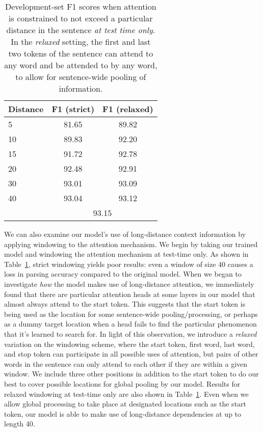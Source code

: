 \documentclass[11pt,a4paper]{article}
\begin{document}
\begin{table}[t!]
\begin{center}
\begin{tabular}{@{}lcc@{}}
\toprule
Distance & \phantom{a}F1 (strict)\phantom{a} & F1 (relaxed) \\
\midrule
5  & 81.65 & 89.82 \\
10 & 89.83 & 92.20 \\
15 & 91.72 & 92.78 \\
20 & 92.48 & 92.91 \\
30 & 93.01 & 93.09 \\
40 & 93.04 & 93.12 \\
 & \multicolumn{2}{c}{93.15} \\
\bottomrule
\end{tabular}
\end{center}
\caption{
\label{table:distance-pretrained}
Development-set F1 scores when attention is constrained to not exceed a particular distance in the sentence \emph{at test time only}. In the \emph{relaxed} setting, the first and last two tokens of the sentence can attend to any word and be attended to by any word, to allow for sentence-wide pooling of information.
}
\end{table}

We can also examine our model's use of long-distance context information by applying windowing to the attention mechanism. We begin by taking our trained model and windowing the attention mechanism at test-time only. As shown in Table~\ref{table:distance-pretrained}, strict windowing yields poor results: even a window of size 40 causes a loss in parsing accuracy compared to the original model. When we began to investigate \emph{how} the model makes use of long-distance attention, we immediately found that there are particular attention heads at some layers in our model that almost always attend to the start token. This suggests that the start token is being used as the location for some sentence-wide pooling/processing, or perhaps as a dummy target location when a head fails to find the particular phenomenon that it's learned to search for. In light of this observation, we introduce a \emph{relaxed} variation on the windowing scheme, where the start token, first word, last word, and stop token can participate in all possible uses of attention, but pairs of other words in the sentence can only attend to each other if they are within a given window. We include three other positions in addition to the start token to do our best to cover possible locations for global pooling by our model. Results for relaxed windowing at test-time only are also shown in Table~\ref{table:distance-pretrained}. Even when we allow global processing to take place at designated locations such as the start token, our model is able to make use of long-distance dependencies at up to length 40.
\end{document}
